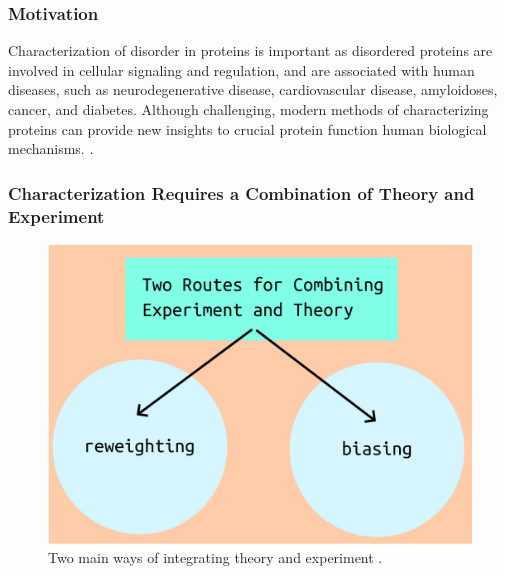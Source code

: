 \documentclass{beamer}
\begin{document}
\begin{frame}
\frametitle{Motivation}
Characterization of disorder in proteins is important as disordered proteins are involved in cellular signaling and regulation,\cite{wrightIntrinsicallyDisorderedProteins2015}
and are associated with human diseases, such as neurodegenerative disease, cardiovascular disease, amyloidoses, cancer, and diabetes.\cite{uverskyIntrinsicallyDisorderedProteins2008}
Although challenging, modern methods of characterizing proteins can provide new insights to crucial protein function human biological mechanisms. \cite{bonomiSimultaneousDeterminationProtein2018}.
\end{frame}


\begin{frame}
\frametitle{Characterization Requires a Combination of Theory and Experiment}
\begin{figure}
    \centering
    \includegraphics[scale=0.3]{two-methods.png}
    \caption{Two main ways of integrating theory and experiment \cite{thomasenConformationalEnsemblesIntrinsically2022}.}
    \label{fig:two-methods}
\end{figure}
\end{frame}
\end{document}
